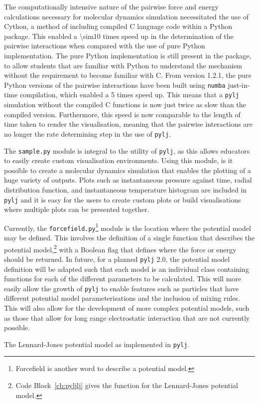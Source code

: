 The computationally intensive nature of the pairwise force and energy calculations necessary for molecular dynamics simulation necessitated the use of Cython, a method of including compiled C language code within a Python package.\autocite{noauthor_cython_nodate}
This enabled a \num{\sim10} times speed up in the determination of the pairwise interactions when compared with the use of pure Python implementation.
The pure Python implementation is still present in the package, to allow students that are familiar with Python to understand the mechanism without the requirement to become familiar with C.
From version 1.2.1,\autocite{mccluskey_arm61/pylj_2019-1} the pure Python versions of the pairwise interactions have been built using \texttt{numba} just-in-time compilation,\autocite{noauthor_numba_nodate} which enabled a \num{5} times speed up.
This means that a \texttt{pylj} simulation without the compiled C functions is now just twice as slow than the compiled version.
Furthermore, this speed is now comparable to the length of time taken to render the visualisation, meaning that the pairwise interactions are no longer the rate determining step in the use of \texttt{pylj}.

The \texttt{sample.py} module is integral to the utility of \texttt{pylj}, as this allows educators to easily create custom visualisation environments.
Using this module, is it possible to create a molecular dynamics simulation that enables the plotting of a huge variety of outputs.
Plots such as instantaneous pressure against time, radial distribution function, and instantaneous temperature histogram are included in \texttt{pylj} and it is easy for the users to create custom plots or build visualisations where multiple plots can be presented together.

Currently, the \texttt{forcefield.py}\footnote{Forcefield is another word to describe a potential model.} module is the location where the potential model may be defined.
This involves the definition of a single function that describes the potential model,\footnote{Code Block~\ref{cb:pyljlj} gives the function for the Lennard-Jones potential model.} with a Boolean flag that defines where the force or energy should be returned.
In future, for a planned \texttt{pylj} \num{2.0}, the potential model definition will be adapted such that each model is an individual class containing functions for each of the different parameters to be calculated.
This will more easily allow the growth of \texttt{pylj} to enable features such as particles that have different potential model parameterisations and the inclusion of mixing rules.
This will also allow for the development of more complex potential models, such as those that allow for long range electrostatic interaction that are not currently possible.
%
\begin{listing}
    \centering
    \caption{The Lennard-Jones potential model as implemented in \texttt{pylj}.}
    
    \label{cb:pyljlj}
\end{listing}
%

